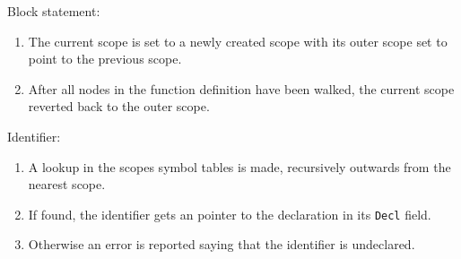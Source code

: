 Block statement:
\begin{enumerate}
	\item The current scope is set to a newly created scope with its outer scope set to point to the previous scope.
	\item After all nodes in the function definition have been walked, the current scope reverted back to the outer scope.
\end{enumerate}

Identifier:
\begin{enumerate}
	\item A lookup in the scopes symbol tables is made, recursively outwards from the nearest scope.
	\item If found, the identifier gets an pointer to the declaration in its \texttt{Decl} field.
	\item Otherwise an error is reported saying that the identifier is undeclared.
\end{enumerate}
